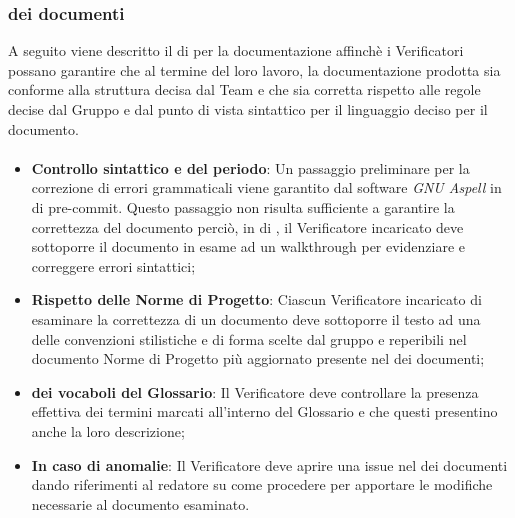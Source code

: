 \subsubsection{ dei documenti}
A seguito viene descritto il  di  per la documentazione affinchè i Verificatori possano garantire che al termine del loro lavoro, la documentazione prodotta sia conforme alla struttura decisa dal Team e che sia corretta rispetto alle regole decise dal Gruppo e dal punto di vista sintattico per il linguaggio deciso per il documento.

\paragraph*{}
\begin{itemize}
\item \textbf{Controllo sintattico e del periodo}: Un passaggio preliminare per la correzione di errori grammaticali viene garantito dal software \textit{GNU Aspell} in  di pre-commit. Questo passaggio non risulta sufficiente a garantire la correttezza del documento perciò, in  di , il Verificatore incaricato deve sottoporre il documento in esame ad un walkthrough per evidenziare e correggere errori sintattici;
  \item \textbf{Rispetto delle Norme di Progetto}: Ciascun Verificatore incaricato di esaminare la correttezza di un documento deve sottoporre il testo ad una  delle convenzioni stilistiche e di forma scelte dal gruppo e reperibili nel documento Norme di Progetto pi\`u aggiornato presente nel  dei documenti;
  \item \textbf{ dei vocaboli del Glossario}: Il Verificatore deve controllare la presenza effettiva dei termini marcati all'interno del Glossario e che questi presentino anche la loro descrizione;
  \item \textbf{In caso di anomalie}: Il Verificatore deve aprire una issue nel  dei documenti dando riferimenti al redatore su come procedere per apportare le modifiche necessarie al documento esaminato.
\end{itemize}
